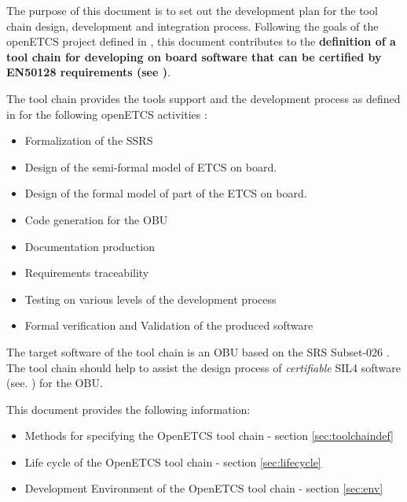 The purpose of this document is to set out the development plan
for the tool chain design, development and integration process.
Following the goals of the openETCS project defined in \cite{FPP},
this document contributes to the {\bf definition of a tool chain 
 for developing on board  software that can be certified by EN50128
 requirements (see \cite{standard_railway_2011})}.

The tool chain provides the tools support and the development process as
defined in \cite{D2.6} for the following openETCS activities :
\begin{itemize}
\item Formalization of the \gls{SSRS} 
\item Design  of the semi-formal model of \gls{ETCS} on board.
\item Design of the formal model of part of the \gls{ETCS} on board.
\item Code generation for  the \gls{OBU}
\item Documentation production
\item Requirements traceability 
\item Testing on various levels of the development process
\item Formal verification and  Validation of the produced software

\end{itemize}

The target software of the tool chain is an \gls{OBU} 
based on the \gls{SRS} Subset-026 \cite{unisig_subset-026_2012}.
The tool chain should help to assist the design process of {\em certifiable} \gls{SIL}4
software (see. \cite{D2.2}) for the \gls{OBU}. 

This document provides the following information:
\begin{itemize}
\item Methods for specifying the OpenETCS tool chain - section \ref{sec:toolchaindef}
\item Life cycle of the OpenETCS tool chain - section \ref{sec:lifecycle}
\item Development Environment of the OpenETCS tool chain - section \ref{sec:env}
\end{itemize}




